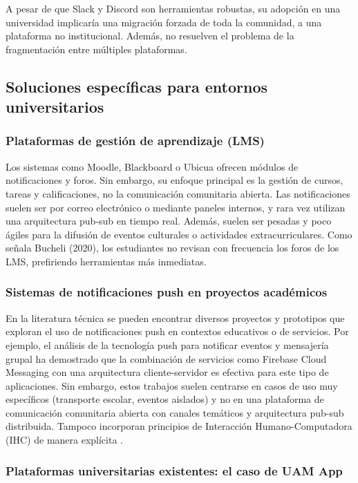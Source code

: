 A pesar de que Slack y Discord son herramientas robustas, su adopción en una universidad implicaría una migración forzada de toda la comunidad, a una plataforma no institucional. Además, no resuelven el problema de la fragmentación entre múltiples plataformas.

\subsection{Soluciones específicas para entornos universitarios}

\subsubsection{Plataformas de gestión de aprendizaje (LMS)}

Los sistemas como Moodle, Blackboard o Ubicua ofrecen módulos de notificaciones y foros. Sin embargo, su enfoque principal es la gestión de cursos, tareas y calificaciones, no la comunicación comunitaria abierta. Las notificaciones suelen ser por correo electrónico o mediante paneles internos, y rara vez utilizan una arquitectura pub-sub en tiempo real. Además, suelen ser pesadas y poco ágiles para la difusión de eventos culturales o actividades extracurriculares. Como señala Bucheli (2020), los estudiantes no revisan con frecuencia los foros de los LMS, prefiriendo herramientas más inmediatas.

\subsubsection{Sistemas de notificaciones push en proyectos académicos}

En la literatura técnica se pueden encontrar diversos proyectos y prototipos que exploran el uso de notificaciones push en contextos educativos o de servicios. Por ejemplo, el análisis de la tecnología push para notificar eventos y mensajería grupal ha demostrado que la combinación de servicios como Firebase Cloud Messaging con una arquitectura cliente-servidor es efectiva para este tipo de aplicaciones. Sin embargo, estos trabajos suelen centrarse en casos de uso muy específicos (transporte escolar, eventos aislados) y no en una plataforma de comunicación comunitaria abierta con canales temáticos y arquitectura pub-sub distribuida. Tampoco incorporan principios de Interacción Humano-Computadora (IHC) de manera explícita \cite{amexcomp2020ihc}.

\subsubsection{Plataformas universitarias existentes: el caso de UAM App}

